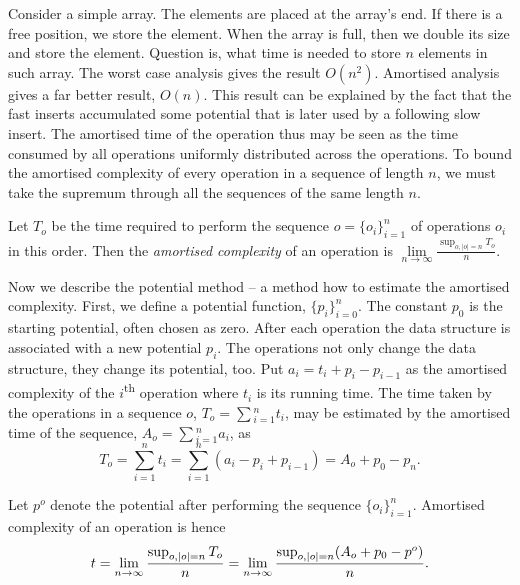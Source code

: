 Consider a simple array. The elements are placed at the array's end. If there is a free position, we store the element. When the array is full, then we double its size and store the element. Question is, what time is needed to store $n$ elements in such array. The worst case analysis gives the result $O(n ^ 2)$. Amortised analysis gives a far better result, $O(n)$. This result can be explained by the fact that the fast inserts accumulated some potential that is later used by a following slow insert. The amortised time of the operation thus may be seen as the time consumed by all operations uniformly distributed across the operations. To bound the amortised complexity of every operation in a sequence of length $n$, we must take the supremum through all the sequences of the same length $n$.
\begin{definition}[Amortised complexity]
Let $T_o$ be the time required to perform the sequence $o=\{o_i\}_{i=1}^n$ of operations $o_i$ in this order. Then the \emph{amortised complexity} of an operation is $\lim\limits_{n \rightarrow \infty}\frac{\sup_{o, |o| = n}T_o}{n}$.
\end{definition}

Now we describe the potential method -- a method how to estimate the amortised complexity. First, we define a potential function, $\{p_i\}_{i = 0}^{n}$. The constant $p_0$ is the starting potential, often chosen as zero. After each operation the data structure is associated with a new potential $p_i$. The operations not only change the data structure, they change its potential, too. Put $a_i = t_i + p_{i} - p_{i - 1}$ as the amortised complexity of the $i$\textsuperscript{th} operation where $t_i$ is its running time. The time taken by the operations in a sequence $o$, $T_o = \sum\displaystyle_{i = 1}^{n} t_i$, may be estimated by the amortised time of the sequence, $A_o = \sum\displaystyle_{i = 1}^{n} a_i$, as
\[
	T_o = \displaystyle\sum_{i = 1}^{n} t_i = \displaystyle\sum_{i = 1}^{n} (a_i - p_i + p_{i - 1}) = A_o + p_0 - p_n \text{.}
\]

Let $p^o$ denote the potential after performing the sequence $\{o_i\}_{i = 1}^{n}$. Amortised complexity of an operation is hence
\[
	t = \lim\limits_{n \rightarrow \infty} \frac{\sup\displaylimits_{o, |o| = n} T_o}{n} = \lim\limits_{n \rightarrow \infty} \frac{\sup\displaylimits_{o, |o| = n} (A_o + p_0 - p^o)}{n} \text{.}
\]

